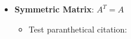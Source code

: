 

\begin{itemize}[topsep=-3pt, itemsep=-1pt]
    \item \textbf{Symmetric Matrix}: $A^T = A$
    \begin{itemize}[topsep = -1pt]
        \item Test paranthetical citation:~\parencite{roussel2022differentiable}
    \end{itemize}
\end{itemize}